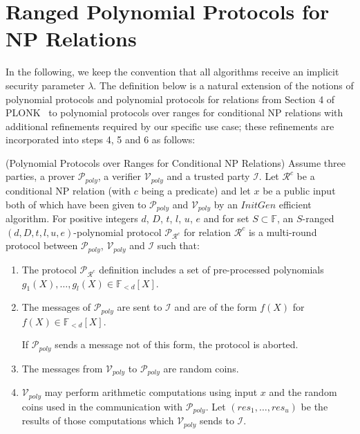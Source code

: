 \section{Ranged Polynomial Protocols for NP Relations}
\label{supplementary_poly_protocols_appendix}

\noindent In the following, we keep the convention that all algorithms receive an implicit security parameter $\lambda$. The definition below 
is a natural extension of the notions of polynomial protocols and polynomial protocols for relations from Section 4 of PLONK~\cite{plonk} to 
polynomial protocols over ranges for conditional NP relations with additional refinements required by our specific use case; these refinements are 
incorporated into steps 4, 5 and 6 as follows: 

\begin{definition}(Polynomial Protocols over Ranges for Conditional NP Relations)
\label{def_ranged_poly_protocol}
Assume three parties, a prover $\mathcal{P}_{poly}$, a verifier $\mathcal{V}_{poly}$ and a trusted party $\mathcal{I}$. 
Let $\mathcal{R}^c$ be a conditional NP relation (with $c$ being a predicate) and let $x$ be a public 
input both of which have been given to $\mathcal{P}_{poly}$ and $\mathcal{V}_{poly}$ by an $\mathit{InitGen}$ efficient algorithm. 
For positive integers $d$, $D$, $t$, $l$, $u$, $e$ and for set 
$S \subset \mathbb{F}$, an $S$-ranged $(d, D, t, l, u, e)$-polynomial protocol $\mathscr{P}_{\mathcal{R}^c}$ for relation $\mathcal{R}^c$ is a multi-round 
protocol between $\mathcal{P}_{poly}$, $\mathcal{V}_{poly}$ and $\mathcal{I}$ such that:

\begin{enumerate}
\item The protocol $\mathscr{P}_{\mathcal{R}^c}$ definition includes a set of pre-processed polynomials $g_1(X), \ldots, g_l(X) \in \mathbb{F}_{<d}[X]$. 

\item The messages of $\mathcal{P}_{poly}$ are sent to $\mathcal{I}$ and are of the form $f(X)$ for $f(X) \in \mathbb{F}_{<d}[X]$. 

If $\mathcal{P}_{poly}$ sends a message not of this form, the protocol is aborted.
\item The messages from $\mathcal{V}_{poly}$ to $\mathcal{P}_{poly}$ are random coins.

\item
$\mathcal{V}_{poly}$ may perform arithmetic computations using input $x$ and the random coins used in the 
communication with $\mathcal{P}_{poly}$. Let $(\mathit{res_1}, \ldots, \mathit{res_u})$ be the results of those computations 
which $\mathcal{V}_{poly}$ sends to $\mathcal{I}$. 


\end{enumerate}
\end{definition}
